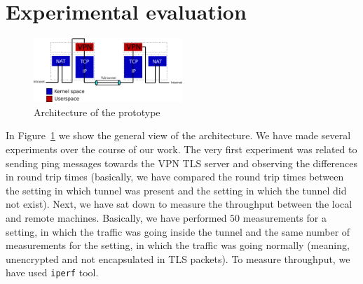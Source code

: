 \section{Experimental evaluation}
\label{section:experiments}



\begin{figure}[!h]
        \includegraphics[width=0.5\textwidth]{graphics/architecture.png}
        \caption{Architecture of the prototype}
        \label{fig:arch}
\end{figure}



In Figure~\ref{fig:arch} we show the general view of the architecture. 
We have made several experiments over the course of our work. The very first experiment was 
related to sending ping messages towards the VPN TLS server and observing the differences in
round trip times (basically, we have compared the round trip times between the setting in 
which tunnel was present and the setting in which the tunnel did not exist). Next, we have
sat down to measure the throughput between the local and remote machines. Basically, we have 
performed $50$ measurements for a setting, in which the traffic was going inside the tunnel
and the same number of measurements for the setting, in which the traffic was going 
normally (meaning, unencrypted and not encapsulated in TLS packets). To measure throughput,
we have used \texttt{iperf} tool.

